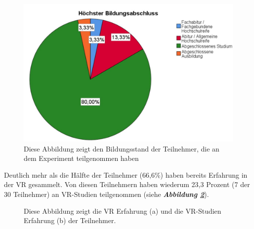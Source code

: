 \documentclass[a4paper,11pt]{article}%
\renewcommand{\\}{\vspace*{0.5\baselineskip} \newline}
\begin{document}
\begin{figure}[H]
		\begin{footnotesize}
		\centering
			\includegraphics[scale=0.4]{Abbildungen/Demographie/teilnehmerBildungsstand.JPG}
			\caption[Der Bildungsstand der Teilnehmer]{Diese Abbildung zeigt den Bildungsstand der Teilnehmer, die an dem Experiment teilgenommen haben}
			\label{teilnehmerBildungsstand}
		\end{footnotesize}
	\end{figure}

Deutlich mehr als die Hälfte der Teilnehmer (66,6\%) haben bereits Erfahrung in der VR gesammelt. Von diesen Teilnehmern haben wiederum 23,3 Prozent (7 der 30 Teilnehmer) an VR-Studien teilgenommen (siehe \textbf{\textit{Abbildung \ref{teilnehmerVRErfahrungen}}}).

\begin{figure}[h]
  \centering
  \qquad
  \caption[Die vorhandene VR-Erfahrung der Teilnehmer]{Diese Abbildung zeigt die VR Erfahrung (a) und die VR-Studien Erfahrung (b) der Teilnehmer.}
  \label{teilnehmerVRErfahrungen}
\end{figure}
\end{document}
